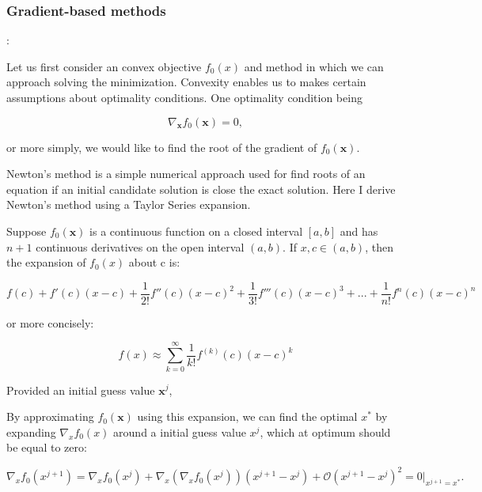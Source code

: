 \subsubsection{Gradient-based methods}

:

Let us first consider an convex objective $f_0(x)$ and method in which we can approach solving the minimization. Convexity enables us to makes certain assumptions about optimality conditions. One optimality condition being 

\begin{equation*}
    \nabla_{\boldsymbol{x}} f_0(\boldsymbol{x}) = 0,
\end{equation*}

or more simply, we would like to find the root of the gradient of $f_0(\boldsymbol{x})$.

Newton's method is a simple numerical approach used for find roots of an equation if an initial candidate solution is close the exact solution. Here I derive Newton's method using a Taylor Series expansion. 

Suppose $f_0(\boldsymbol{x})$ is a continuous function on a closed interval $[a, b]$ and has $n+1$ continuous derivatives on the open interval $(a, b)$. If $x, c \in (a, b)$, then the expansion of $f_0(x)$ about c is:

\begin{equation*}
    f(c) + f'(c)(x - c) + \frac{1}{2!} f''(c)(x-c)^2 + \frac{1}{3!} f'''(c)(x-c)^3 + ... + \frac{1}{n!}f^n(c)(x-c)^n
\end{equation*}

or more concisely:

\begin{equation*}
    f(x) \approx \sum^{\infty}_{k=0} \frac{1}{k!} f^{(k)}(c)(x-c)^k
\end{equation*}

Provided an initial guess value $\boldsymbol{x}^j$,

By approximating $f_0(\boldsymbol{x})$ using this expansion, we can find the optimal $x^\ast$ by expanding $\nabla_x f_0(x)$ around a initial guess value $x^j$, which at optimum should be equal to zero:

\begin{equation*}
    \nabla_x f_0(x^{j+1}) = \nabla_x f_0(x^{j}) + \nabla_x(\nabla_x f_0(x^j))(x^{j+1} - x^{j}) + \mathcal{O}(x^{j+1}-x^{j})^2 = 0|_{x^{j+1} = x^\ast}. 
\end{equation*}

